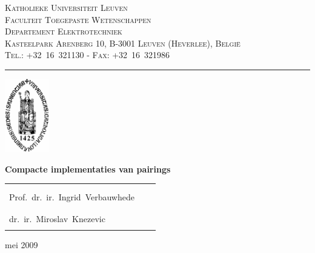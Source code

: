 \documentclass[a4paper]{article}    %
\newcommand{\opgave}{Compacte implementaties van pairings}
\newcommand{\titel}{\LARGE \opgave}
\newcommand{\datum}{22 mei 2009}
\newcommand{\departement}{Departement Elektrotechniek}
\newcommand{\depadres}{Kasteelpark Arenberg 10, B-3001 Leuven (Heverlee), Belgi\"e}
\newcommand{\depcontact}{Tel.: +32~16~321130 - Fax: +32~16~321986}
\newcommand{\professoren}{Prof.~dr.~ir.~Bart~Preneel\\Prof.~dr.~ir.~Ingrid~Verbauwhede}
\newcommand{\assistenten}{dr.~ir.~Lejla~Batina\\dr.~ir.~Miroslav~Knezevic}
\newcommand{\student}{Anthony~Van~Herrewege}
\begin{document}
\thispagestyle{empty}

\begin{minipage}[c]{100mm}
\small
\textsc{Katholieke Universiteit Leuven\\
Faculteit Toegepaste Wetenschappen\\
\departement\\[3mm]
\depadres\\
\depcontact}
\end{minipage}
\hfill
\begin{minipage}{45mm}
\parbox[b]{15mm}{\rule{1pt}{32mm}}
\includegraphics[height=32mm,bb=0 0 309 520]{voorblad-sedes}
\end{minipage}


\begin{center}
\parbox[c]{0.7\textwidth}{
    \centering \textbf{\titel}
}
\end{center}


\begin{tabular}{p{6cm} p{5cm} p{5cm}}
	\begin{minipage}[b]{60mm}
		{\large Promotors:\\}
		\professoren \\[3mm]
		{\large Assistenten:\\}
		\assistenten
	\end{minipage}

	& &

	\begin{minipage}[b]{50mm}
		{\large Door:\\}
		\student
	\end{minipage}
\end{tabular}


\vspace*{20mm}

\centering \datum

\vfill	
\end{document}
